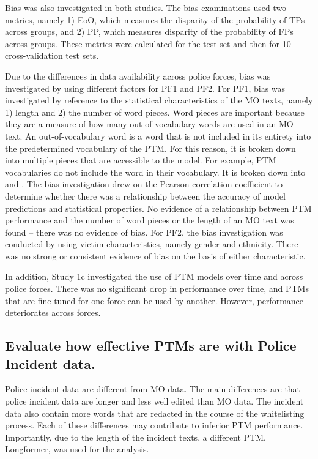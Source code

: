 Bias was also investigated in both studies. The bias examinations used two metrics, namely 1) EoO, which measures the disparity of the probability of TPs across groups, and 2) PP, which measures disparity of the probability of FPs across groups. These metrics were calculated for the test set and then for 10 cross-validation test sets. 

Due to the differences in data availability across police forces, bias was investigated by using different factors for PF1 and PF2. For PF1, bias was investigated by reference to the statistical characteristics of the MO texts, namely 1) length and 2) the number of word pieces. Word pieces are important because they are a measure of how many out-of-vocabulary words are used in an MO text. An out-of-vocabulary word is a word that is not included in its entirety into the predetermined vocabulary of the PTM. For this reason, it is broken down into multiple pieces that are accessible to the model. For example, PTM vocabularies do not include the word  in their vocabulary. It is broken down into  and . The bias investigation drew on the Pearson correlation coefficient to determine whether there was a relationship between the accuracy of model predictions and statistical properties. No evidence of a relationship between PTM performance and the number of word pieces or the length of an MO text was found – there was no evidence of bias. For PF2, the bias investigation was conducted by using victim characteristics, namely gender and ethnicity. There was no strong or consistent evidence of bias on the basis of either characteristic.

In addition, Study 1c investigated the use of PTM models over time and across police forces. There was no significant drop in performance over time, and PTMs that are fine-tuned for one force can be used by another. However, performance deteriorates across forces.
 
\subsection{Evaluate how effective PTMs are with Police Incident data.} Police incident data are different from MO data. The main differences are that police incident data are longer and less well edited than MO data. The incident data also contain more words that are redacted in the course of the whitelisting process. Each of these differences may contribute to inferior PTM performance. Importantly, due to the length of the incident texts, a different PTM, Longformer, was used for the analysis.

